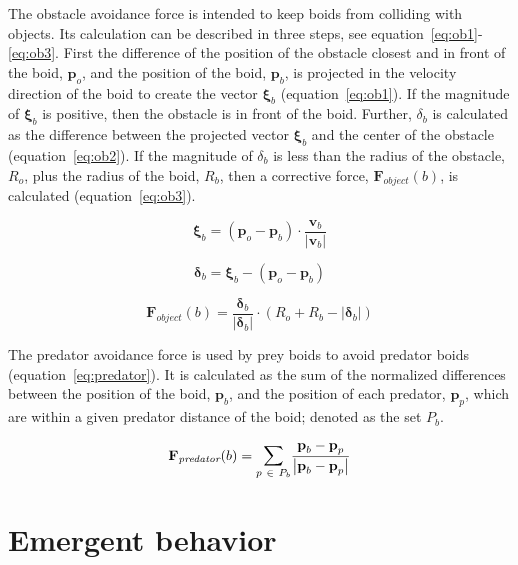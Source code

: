 The obstacle avoidance force is intended to keep boids from colliding with objects. Its calculation can be described in three steps, see equation~\ref{eq:ob1}-\ref{eq:ob3}. First the difference of the position of the obstacle closest and in front of the boid, $\textbf{p}_o$, and the position of the boid, $\textbf{p}_b$, is projected in the velocity direction of the boid to create the vector $\boldsymbol{\xi}_b$ (equation~\ref{eq:ob1}). If the magnitude of $\boldsymbol{\xi}_b$ is positive, then the obstacle is in front of the boid. Further, $\delta_b$ is calculated as the difference between the projected vector $\boldsymbol{\xi}_b$ and the center of the obstacle (equation~\ref{eq:ob2}). If the magnitude of $\delta_b$ is less than the radius of the obstacle, $R_o$, plus the radius of the boid, $R_b$, then a corrective force, $\textbf{F}_\textit{object}(b)$, is calculated (equation~\ref{eq:ob3}).

\begin{equation}
\label{eq:ob1}
\boldsymbol{\xi}_b = (\textbf{p}_o - \textbf{p}_b) \cdot \frac{\textbf{v}_b}{\left\vert\textbf{v}_b\right\vert}
\end{equation}

\begin{equation}
\label{eq:ob2}
\boldsymbol{\delta}_b = \boldsymbol{\xi}_b - (\textbf{p}_o - \textbf{p}_b)
\end{equation}

\begin{equation}
\label{eq:ob3}
\textbf{F}_\textit{object}(b) = \frac{\boldsymbol{\delta}_b}{\left\vert\boldsymbol{\delta}_b\right\vert} \cdot (R_o + R_b - \left\vert\boldsymbol{\delta}_b\right\vert)
\end{equation}

The predator avoidance force is used by prey boids to avoid predator boids (equation~\ref{eq:predator}). It is calculated as the sum of the normalized differences between the position of the boid, $\textbf{p}_b$, and the position of each predator, $\textbf{p}_p$, which are within a given predator distance of the boid; denoted as the set $P_b$.

\begin{equation}
\label{eq:predator}
\textbf{F}_\textit{predator}(b) = \mathlarger{\sum}_{p~\in~P_b} \frac{\textbf{p}_b - \textbf{p}_p}{\left\vert\textbf{p}_b - \textbf{p}_p\right\vert}
\end{equation}

\section*{Emergent behavior}

